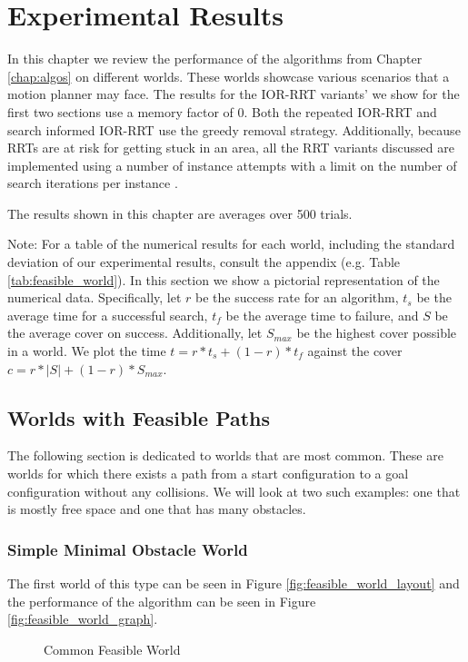 \chapter{Experimental Results}
In this chapter we review the performance of the algorithms from Chapter \ref{chap:algos} on different worlds. These worlds showcase various scenarios that a motion planner may face. The results for the IOR-RRT variants' we show for the first two sections use a memory factor of 0. Both the repeated IOR-RRT and search informed IOR-RRT use the greedy removal strategy. Additionally, because RRTs are at risk for getting stuck in an area, all the RRT variants discussed are implemented using a number of instance attempts with a limit on the number of search iterations per instance \cite{wedge:heavytail}.

The results shown in this chapter are averages over 500 trials.

Note: For a table of the numerical results for each world, including the standard deviation of our experimental results, consult the appendix (e.g. Table \ref{tab:feasible_world}). In this section we show a pictorial representation of the numerical data. Specifically, let $r$ be the success rate for an algorithm, $t_s$ be the average time for a successful search, $t_f$ be the average time to failure, and $S$ be the average cover on success. Additionally, let $S_{max}$ be the highest cover possible in a world. We plot the time $t = r * t_s + (1-r) * t_f$ against the cover $c = r * |S| + (1-r) * S_{max}$.

\section{Worlds with Feasible Paths}\label{results:feasible}
The following section is dedicated to worlds that are most common. These are worlds for which there exists a path from a start configuration to a goal configuration without any collisions. We will look at two such examples: one that is mostly free space and one that has many obstacles.

\subsection{Simple Minimal Obstacle World}
The first world of this type can be seen in Figure \ref{fig:feasible_world_layout} and the performance of the algorithm can be seen in Figure \ref{fig:feasible_world_graph}. 

\begin{figure}[!h]
    \hfill
    \caption{Common Feasible World}
    \label{fig:feasible_world}
\end{figure}

